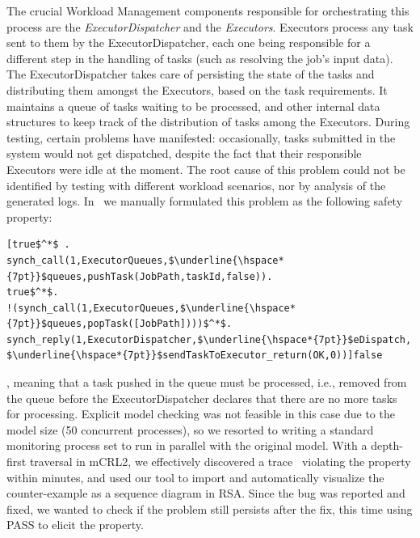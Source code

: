 \documentclass[letter]{llncs}
\begin{document}
The crucial Workload Management components responsible for orchestrating this process are the \emph{ExecutorDispatcher} and 
the \emph{Executors}. Executors process any task sent to them by the ExecutorDispatcher, each one being responsible for a different step in the handling of tasks
(such as resolving the job's input data).
The ExecutorDispatcher takes care of persisting the state of the tasks and distributing them amongst the Executors, based on the
task requirements. It maintains a queue of tasks waiting to be processed, and other internal data structures to keep track
of the distribution of tasks among the Executors.
During testing, certain problems have manifested: occasionally, tasks submitted in the system would not get dispatched, despite the fact that their responsible Executors
were idle at the moment. The root cause of this problem could not be identified by testing  with different workload scenarios, nor by analysis of the 
generated logs. 
In~\cite{DBLP:dblp_conf/nfm/RemenskaTWHVCB13} we manually formulated this problem as the following safety property:
\begin{lstlisting}[basicstyle=\sffamily\fontsize{7}{7}\selectfont,showspaces=false,showstringspaces=false,showtabs=false,mathescape]
[true$^*$ .
synch_call(1,ExecutorQueues,$\underline{\hspace*{7pt}}$queues,pushTask(JobPath,taskId,false)).
true$^*$.
!(synch_call(1,ExecutorQueues,$\underline{\hspace*{7pt}}$queues,popTask([JobPath])))$^*$.
synch_reply(1,ExecutorDispatcher,$\underline{\hspace*{7pt}}$eDispatch,
$\underline{\hspace*{7pt}}$sendTaskToExecutor_return(OK,0))]false 
\end{lstlisting} 
\vspace{-5 pt}

, meaning that a task pushed in the queue must be processed, i.e., removed from the queue before the ExecutorDispatcher
declares that there are no more tasks for processing.
Explicit model checking was not feasible in this case due to the model size (50 concurrent processes),
so we resorted to writing a standard monitoring process set to run in parallel with the original model.
With a depth-first traversal in mCRL2, we effectively discovered a trace~\cite{repo:remenska} violating the property within minutes, and
used our tool to import and automatically visualize the counter-example as a sequence diagram in RSA.
Since the bug was reported and fixed, we wanted to check if the problem still persists after the fix, this time using PASS to 
elicit the property.
\vspace{-11 pt}
\label{sec:CaseStudy}
\end{document}
